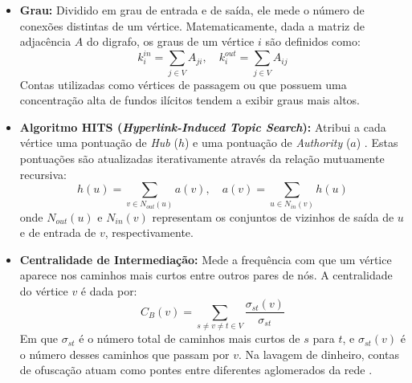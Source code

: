 \documentclass[titlepage,a4paper,oneside,onecolumn,12pt]{report}
\begin{document}
\begin{itemize}
\item \textbf{Grau:} Dividido em grau de entrada e de saída, ele mede o número de conexões distintas de um vértice. Matematicamente, dada a matriz de adjacência $A$ do digrafo, os graus de um vértice $i$ são definidos como:
\begin{equation}
    k_i^{in} = \sum_{j \in V} A_{ji}, \quad k_i^{out} = \sum_{j \in V} A_{ij}
\end{equation}
Contas utilizadas como vértices de passagem ou que possuem uma concentração alta de fundos ilícitos tendem a exibir graus mais altos.

\item \textbf{Algoritmo HITS (\textit{Hyperlink-Induced Topic Search}):} Atribui a cada vértice uma pontuação de \textit{Hub} ($h$) e uma pontuação de \textit{Authority} ($a$) \cite{elkilany2024detecting}. Estas pontuações são atualizadas iterativamente através da relação mutuamente recursiva:
\begin{equation}
    h(u) = \sum_{v \in N_{out}(u)} a(v), \quad a(v) = \sum_{u \in N_{in}(v)} h(u)
\end{equation}
onde $N_{out}(u)$ e $N_{in}(v)$ representam os conjuntos de vizinhos de saída de $u$ e de entrada de $v$, respectivamente.

\item \textbf{Centralidade de Intermediação:} Mede a frequência com que um vértice aparece nos caminhos mais curtos entre outros pares de nós. A centralidade do vértice $v$ é dada por:
\begin{equation}
    C_B(v) = \sum_{s \neq v \neq t \in V} \frac{\sigma_{st}(v)}{\sigma_{st}}
\end{equation}
Em que $\sigma_{st}$ é o número total de caminhos mais curtos de $s$ para $t$, e $\sigma_{st}(v)$ é o número desses caminhos que passam por $v$. Na lavagem de dinheiro, contas de ofuscação atuam como pontes entre diferentes aglomerados da rede \cite{freeman1977set}.


\end{itemize}
\end{document}
